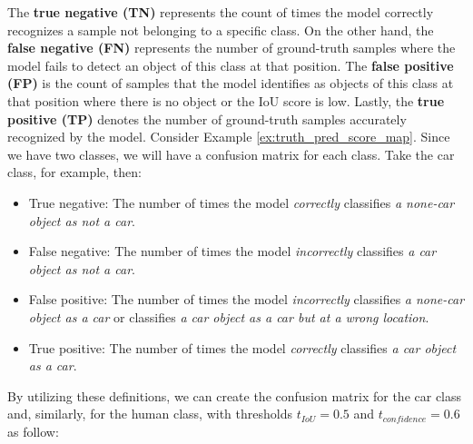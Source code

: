 The \textbf{true negative (TN)} represents the count of times the model correctly recognizes a sample not belonging to a specific class. On the other hand, the \textbf{false negative (FN)} represents the number of ground-truth samples where the model fails to detect an object of this class at that position. The \textbf{false positive (FP)} is the count of samples that the model identifies as objects of this class at that position where there is no object or the IoU score is low. Lastly, the \textbf{true positive (TP)} denotes the number of ground-truth samples accurately recognized by the model. Consider Example \ref{ex:truth_pred_score_map}. Since we have two classes, we will have a confusion matrix for each class. Take the car class, for example, then:
\begin{itemize}
    \item True negative: The number of times the model \emph{correctly} classifies \emph{a none-car object as not a car}.
    \item False negative: The number of times the model \emph{incorrectly} classifies \emph{a car object as not a car}.
    \item False positive: The number of times the model \emph{incorrectly} classifies \emph{a none-car object as a car} or classifies \emph{a car object as a car but at a wrong location}.
    \item True positive: The number of times the model \emph{correctly} classifies \emph{a car object as a car}.
\end{itemize}
By utilizing these definitions, we can create the confusion matrix for the car class and, similarly, for the human class, with thresholds $t_{IoU}=0.5$ and $t_{confidence}=0.6$ as follow:

